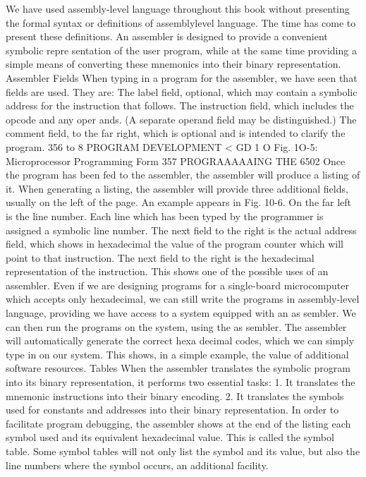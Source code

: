 \documentclass{book}
\begin{document}
{{{{{{{{{{{{{{{{{{{{{{{{{{{{{{{{{{{{{{{{{{{{{{{{{{{{{{{{{{{{{{{{{{{{{{{{{{{{{{{{{{{{{{{{{{{{{{{{{{{{{{{{{{{{{{{{{{{{{{{{{{{{{{{{{{{{{{{{{{{{We have used assembly-level language throughout this book
without presenting the formal syntax or definitions of assemblylevel
language. The time has come to present these definitions.
An assembler is designed to provide a convenient symbolic repre
sentation of the user program, while at the same time providing a
simple means of converting these mnemonics into their binary
representation.
Assembler Fields
When typing in a program for the assembler, we have seen that
fields are used. They are:
The label field, optional, which may contain a symbolic address
for the instruction that follows.
The instruction field, which includes the opcode and any oper
ands. (A separate operand field may be distinguished.)
The comment field, to the far right, which is optional and is
intended to clarify the program.
356
to
8
PROGRAM DEVELOPMENT
<
GD
1
O
Fig. 1O-5: Microprocessor Programming Form
357
PROGRAAAAAING THE 6502
Once the program has been fed to the assembler, the assembler will
produce a listing of it. When generating a listing, the assembler will
provide three additional fields, usually on the left of the page. An
example appears in Fig. 10-6. On the far left is the line number. Each
line which has been typed by the programmer is assigned a symbolic
line number.
The next field to the right is the actual address field, which shows
in hexadecimal the value of the program counter which will point to
that instruction.
The next field to the right is the hexadecimal representation of the
instruction.
This shows one of the possible uses of an assembler. Even if we are
designing programs for a single-board microcomputer which accepts
only hexadecimal, we can still write the programs in assembly-level
language, providing we have access to a system equipped with an as
sembler. We can then run the programs on the system, using the as
sembler. The assembler will automatically generate the correct hexa
decimal codes, which we can simply type in on our system. This
shows, in a simple example, the value of additional software resources.
Tables
When the assembler translates the symbolic program into its binary
representation, it performs two essential tasks:
1. It translates the mnemonic instructions into their binary encoding.
2. It translates the symbols used for constants and addresses into
their binary representation.
In order to facilitate program debugging, the assembler shows at
the end of the listing each symbol used and its equivalent hexadecimal
value. This is called the symbol table.
Some symbol tables will not only list the symbol and its value, but
also the line numbers where the symbol occurs, an additional facility.
}}}}}}}}}}}}}}}}}}}}}}}}}}}}}}}}}}}}}}}}}}}}}}}}}}}}}}}}}}}}}}}}}}}}}}}}}}}}}}}}}}}}}}}}}}}}}}}}}}}}}}}}}}}}}}}}}}}}}}}}}}}}}}}}}}}}}}}}}}}}
\end{document}
